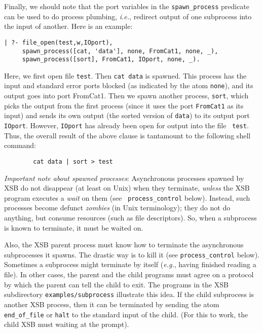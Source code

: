 Finally, we should note that the port variables in the
\verb|spawn_process| predicate can be used to do process plumbing, {\it
  i.e.}, redirect output of one subprocess into the input of another. Here
is an example:
\begin{verbatim}
| ?- file_open(test,w,IOport),
     spawn_process([cat, 'data'], none, FromCat1, none, _),
     spawn_process([sort], FromCat1, IOport, none, _).  
\end{verbatim}
Here, we first open file {\tt test}. Then \verb|cat data| is spawned.  This
process has the input and standard error ports blocked (as indicated by the
atom {\tt none}), and its output goes into port FromCat1.  Then we spawn
another process, {\tt sort}, which picks the output from the first process
(since it uses the port {\tt FromCat1} as its input) and sends its own
output (the sorted version of {\tt data}) to its output port {\tt IOport}.
However, {\tt IOport} has already been open for output into the file {\tt
  test}. Thus, the overall result of the above clause is tantamount to the
following shell command:
\begin{verbatim}
        cat data | sort > test  
\end{verbatim}

{\em Important note about spawned processes\/}: Asynchronous processes
spawned by XSB do not disappear (at least on Unix) when they terminate,
\emph{unless} the XSB program executes a \emph{wait} on them (see {\tt
  process\_control} below). Instead, such processes become defunct
\emph{zombies} (in Unix terminology); they do not do anything, but consume
resources (such as file descriptors). So, when a subprocess is known to
terminate, it must be waited on.

Also, the XSB parent process must know how to terminate the asynchronous
subprocesses it spawns. The drastic way is to kill it (see
{\tt process\_control} below). Sometimes a subprocess might terminate by itself
({\it e.g.}, having finished reading a file). In other cases, the parent
and the child programs must agree on a protocol by which the parent can
tell the child to exit. The programs in the XSB subdirectory
{\tt examples/subprocess} illustrate this idea. If the child subprocess is
another XSB process, then it can be terminated by sending the atom
{\tt end\_of\_file} or {\tt halt} to the standard input of the child. (For
this to work, the child XSB must waiting at the prompt).

